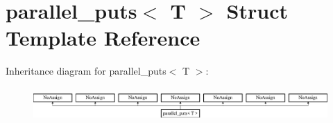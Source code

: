 \hypertarget{structparallel__puts}{}\section{parallel\+\_\+puts$<$ T $>$ Struct Template Reference}
\label{structparallel__puts}
Inheritance diagram for parallel\+\_\+puts$<$ T $>$\+:\begin{figure}[H]
\begin{center}
\leavevmode
\includegraphics[height=1.300813cm]{structparallel__puts}
\end{center}
\end{figure}
